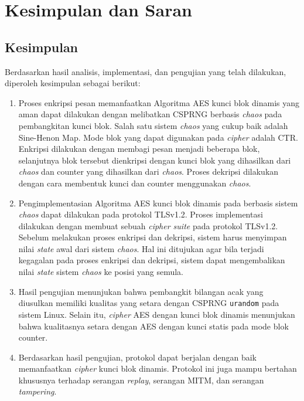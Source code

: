 \chapter{Kesimpulan dan Saran}

\section{Kesimpulan}
Berdasarkan hasil analisis, implementasi, dan pengujian yang telah dilakukan, diperoleh kesimpulan sebagai berikut:
\begin{enumerate}
  \item Proses enkripsi pesan memanfaatkan Algoritma AES kunci blok dinamis yang aman dapat dilakukan dengan melibatkan CSPRNG berbasis \emph{chaos} pada pembangkitan kunci blok. Salah satu sistem \emph{chaos} yang cukup baik adalah Sine-Henon Map. Mode blok yang dapat digunakan pada \emph{cipher} adalah CTR. Enkripsi dilakukan dengan membagi pesan menjadi beberapa blok, selanjutnya blok tersebut dienkripsi dengan kunci blok yang dihasilkan dari \emph{chaos} dan counter yang dihasilkan dari \emph{chaos}. Proses dekripsi dilakukan dengan cara membentuk kunci dan counter menggunakan \emph{chaos}. 
  \item Pengimplementasian Algoritma AES kunci blok dinamis pada berbasis sistem \emph{chaos} dapat dilakukan pada protokol TLSv1.2. Proses implementasi dilakukan dengan membuat sebuah \emph{cipher suite} pada protokol TLSv1.2. Sebelum melakukan proses enkripsi dan dekripsi, sistem harus menyimpan nilai \emph{state} awal dari sistem \emph{chaos}. Hal ini ditujukan agar bila terjadi kegagalan pada proses enkripsi dan dekripsi, sistem dapat mengembalikan nilai \emph{state} sistem \emph{chaos} ke posisi yang semula.
  \item Hasil pengujian menunjukan bahwa pembangkit bilangan acak yang diusulkan memiliki kualitas yang setara dengan CSPRNG \texttt{urandom} pada sistem Linux. Selain itu, \emph{cipher} AES dengan kunci blok dinamis menunjukan bahwa kualitasnya setara dengan AES dengan kunci statis pada mode blok counter.
  \item Berdasarkan hasil pengujian, protokol dapat berjalan dengan baik memanfaatkan \emph{cipher} kunci blok dinamis. Protokol ini juga mampu bertahan khususnya terhadap serangan \emph{replay}, serangan MITM, dan serangan \emph{tampering}. 
\end{enumerate}

